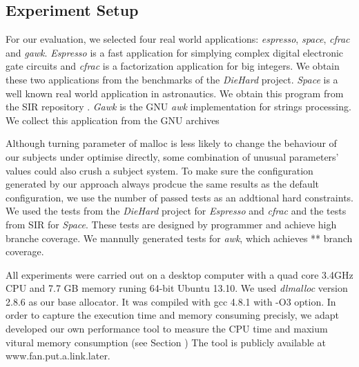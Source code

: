 \subsection{Experiment Setup}


\begin{table}[htbp]
\centering
\caption{subject applications}
\label{tab_sub_app}
\end{table}

For our evaluation, we selected four real world applications: \emph{espresso}, \emph{space}, \emph{cfrac} and \emph{gawk}. \emph{Espresso} is a fast application for simplying complex digital electronic gate circuits and \emph{cfrac} is a factorization application for big integers. We obtain these two applications from the benchmarks of the \emph{DieHard} project\cite{}. \emph{Space} is a well known real world application in astronautics. We obtain this program from the SIR repository \cite{}. \emph{Gawk} is the GNU \emph{awk} implementation for strings processing. We collect this application from the GNU archives \cite{}

Although turning parameter of malloc is less likely to change the behaviour of our subjects under optimise directly, some combination of unusual parameters' values could also crush a subject system. To make sure the configuration generated by our approach always prodcue the same results as the default configuration, we use the number of passed tests as an addtional hard constraints. We used the tests from the \emph{DieHard} project for \emph{Espresso} and \emph{cfrac} and the tests from SIR for \emph{Space}. These tests are designed by programmer and achieve high branche coverage. We mannully generated tests for \emph{awk}, which achieves ** branch coverage. 

All experiments were carried out on a desktop computer with a quad core 3.4GHz CPU and 7.7 GB memory runing 64-bit Ubuntu 13.10. We used \emph{dlmalloc} version 2.8.6 as our base allocator. It was compiled with gcc 4.8.1 with -O3 option. In order to capture the execution time and memory consuming precisly, we adapt developed our own performance tool to measure the CPU time and maxium vitural memory consumption (see Section \label{}) The tool is publicly available at www.fan.put.a.link.later.

